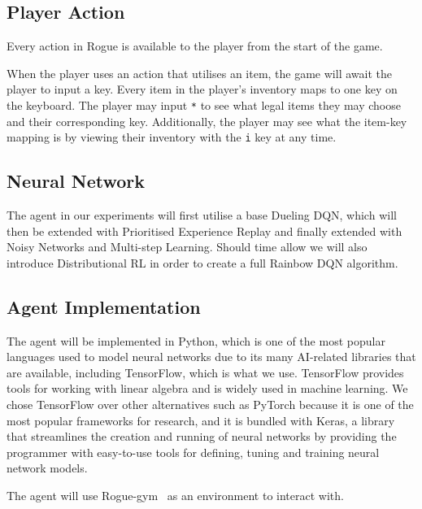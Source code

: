 \documentclass[12pt,a4paper]{article}
\begin{document}
    \subsection{Player Action}\label{subsec:action}
    Every action in Rogue is available to the player from the start of the game.

    When the player uses an action that utilises an item, the game will await the player to input a key.
    Every item in the player's inventory maps to one key on the keyboard.
    The player may input \texttt{*} to see what legal items they may choose and their corresponding key.
    Additionally, the player may see what the item-key mapping is by viewing their inventory with the \texttt{i} key at any time.

    \subsection{Neural Network}\label{subsec:neural-network}
    The agent in our experiments will first utilise a base Dueling DQN, which will then be extended with Prioritised Experience Replay and finally extended with Noisy Networks and Multi-step Learning.
    Should time allow we will also introduce Distributional RL in order to create a full Rainbow DQN algorithm.


    \subsection{Agent Implementation}\label{subsec:implementation}
    The agent will be implemented in Python, which is one of the most popular languages used to model neural networks due to its many AI-related libraries that are available, including TensorFlow, which is what we use.
    TensorFlow provides tools for working with linear algebra and is widely used in machine learning.
    We chose TensorFlow over other alternatives such as PyTorch because it is one of the most popular frameworks for research,
    and it is bundled with Keras, a library that streamlines the creation and running of neural networks by providing the programmer with
    easy-to-use tools for defining, tuning and training neural network models.

    The agent will use Rogue-gym~\citep{kanagawa19} as an environment to interact with.
    
\end{document}
